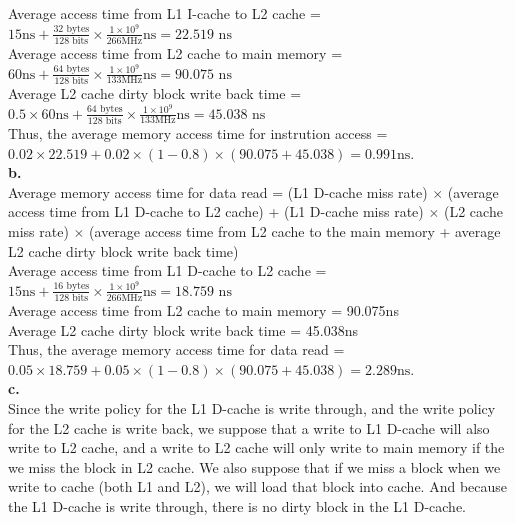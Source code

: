 \documentclass{article}
\begin{document}
\indent Average access time from L1 I-cache to L2 cache = $15\text{ns}+\frac{32\text{ bytes}}{128\text{ bits}}\times\frac{1\times 10^9}{266 \text{MHz}}\text{ns}=22.519\text{ ns}$\\

\indent Average access time from L2 cache to main memory = $60\text{ns}+\frac{64\text{ bytes}}{128\text{ bits}}\times\frac{1\times 10^9}{133 \text{MHz}}\text{ns}=90.075\text{ ns}$\\

\indent Average L2 cache dirty block write back time = $0.5\times 60\text{ns}+\frac{64\text{ bytes}}{128\text{ bits}}\times\frac{1\times 10^9}{133 \text{MHz}}\text{ns}=45.038\text{ ns}$\\

\indent Thus, the average memory access time for instrution access = $0.02\times 22.519+0.02\times (1-0.8)\times (90.075+45.038)=0.991\text{ns}$.\\

\noindent\textbf{b.}\\
\indent Average memory access time for data read = (L1 D-cache miss rate) $\times$ (average access time from L1 D-cache to L2 cache) + (L1 D-cache miss rate) $\times$ (L2 cache miss rate) $\times$ (average access time from L2 cache to the main memory + average L2 cache dirty block write back time)\\

\indent Average access time from L1 D-cache to L2 cache = $15\text{ns}+\frac{16\text{ bytes}}{128\text{ bits}}\times\frac{1\times 10^9}{266 \text{MHz}}\text{ns}=18.759\text{ ns}$\\

\indent Average access time from L2 cache to main memory = 90.075ns\\

\indent Average L2 cache dirty block write back time = 45.038ns\\

Thus, the average memory access time for data read = $0.05\times 18.759+0.05\times (1-0.8)\times (90.075+45.038)=2.289\text{ns}$.\\

\noindent\textbf{c.}\\
\indent Since the write policy for the L1 D-cache is write through, and the write policy for the L2 cache is write back, we suppose that a write to L1 D-cache will also write to L2 cache, and a write to L2 cache will only write to main memory if the we miss the block in L2 cache. We also suppose that if we miss a block when we write to cache (both L1 and L2), we will load that block into cache. And because the L1 D-cache is write through, there is no dirty block in the L1 D-cache.\\
\end{document}
